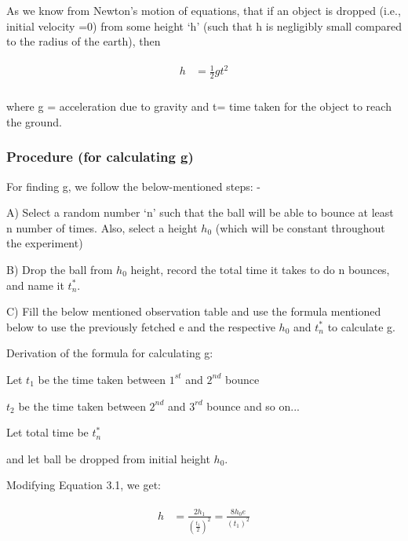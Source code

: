 \documentclass[11pt]{scrartcl} %
\begin{document}
As we know from Newton’s motion of equations, that if an object is dropped (i.e., initial velocity =0) from some height ‘h’ (such that h is negligibly small compared to the radius of the earth), then  \par

\begin{align} 
	\begin{split}
		h &= \frac{1}{2}gt^2\\
	\end{split}					
\end{align}

where g = acceleration due to gravity and t= time taken for the object to reach the ground. \par

\subsubsection{Procedure (for calculating g)}
For finding g, we follow the below-mentioned steps: - \par

A) Select a random number ‘n’ such that the ball will be able to bounce at least n number of times. Also, select a height $h_0$ (which will be constant throughout the experiment)\par

B) Drop the ball from $h_0$ height, record the total time it takes to do n bounces, and name it $t_n^*$. \par

C) Fill the below mentioned observation table and use the formula mentioned below to use the previously fetched e and the respective $h_0$ and $t_n^*$ to calculate g. \par\par

Derivation of the formula for calculating g:\par



Let $t_1$ be the time taken between $1^{st}$ and $2^{nd}$ bounce\par
$t_2$ be the time taken between $2^{nd}$ and $3^{rd}$ bounce and so on...\par\par
Let total time be $t_n^*$\par and let ball be dropped from initial height $h_0$.

\par
Modifying Equation 3.1, we get:\par
\begin{align} 
	\begin{split}
		h &= \frac{2h_1}{(\frac{t_1}{2})^2}=\frac{8h_0e}{(t_1)^2}\\
	\end{split}					
\end{align}
\end{document}
